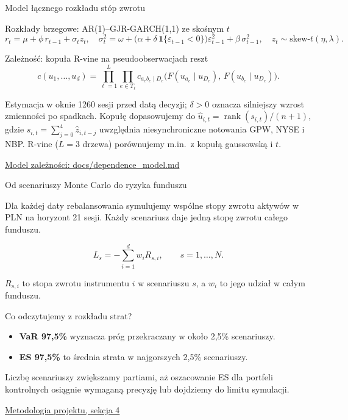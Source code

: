 \documentclass[aspectratio=169,11pt]{beamer}
\newcommand{\ind}{\mathbf{1}}
\newcommand{\source}[2]{\vfill{\scriptsize\href{#1}{#2}}}
\begin{document}
\begin{frame}{Model łącznego rozkładu stóp zwrotu}

\begin{block}{Rozkłady brzegowe: AR(1)--GJR-GARCH(1,1) ze skośnym \(t\)}
\[
  r_t=\mu+\phi\,r_{t-1}+\sigma_t z_t,\quad
  \sigma_t^2=\omega+\bigl(\alpha+\delta\,\ind\{\varepsilon_{t-1}<0\}\bigr)
    \varepsilon_{t-1}^2+\beta\,\sigma_{t-1}^2,\quad
  z_t\sim\text{skew-}t(\eta,\lambda).
\]
\end{block}

\begin{block}{Zależność: kopuła R-vine na pseudoobserwacjach reszt}
\[
  c(u_1,\ldots,u_d)=\prod_{\ell=1}^{L}\prod_{e\in T_\ell}
    c_{a_e b_e\mid D_e}\bigl(F(u_{a_e}\mid u_{D_e}),\,F(u_{b_e}\mid u_{D_e})\bigr).
\]
\end{block}

{\small
Estymacja w oknie 1260 sesji przed datą decyzji; \(\delta>0\) oznacza
silniejszy wzrost zmienności po spadkach. Kopułę dopasowujemy do
\(\hat u_{i,t}=\operatorname{rank}(s_{i,t})/(n+1)\), gdzie
\(s_{i,t}=\sum_{j=0}^{4}\hat z_{i,t-j}\) uwzględnia niesynchroniczne
notowania GPW, NYSE i NBP. R-vine (\(L=3\) drzewa) porównujemy m.in.\
z kopułą gaussowską i \(t\).
}

\source{https://github.com/michalmarchwiak/bsc-project/blob/main/docs/dependence_model.md}
       {Model zależności: docs/dependence\_model.md}
\end{frame}

\begin{frame}{Od scenariuszy Monte Carlo do ryzyka funduszu}

Dla każdej daty rebalansowania symulujemy wspólne stopy zwrotu
aktywów w PLN na horyzont 21 sesji. Każdy scenariusz daje jedną
stopę zwrotu całego funduszu.

\[
  L_s = -\sum_{i=1}^{d} w_i R_{s,i},
  \qquad s=1,\ldots,N.
\]

{\small
\(R_{s,i}\) to stopa zwrotu instrumentu \(i\) w scenariuszu \(s\),
a \(w_i\) to jego udział w całym funduszu.
}

\begin{block}{Co odczytujemy z rozkładu strat?}
\begin{itemize}
  \item \textbf{VaR 97,5\%} wyznacza próg przekraczany
        w około 2,5\% scenariuszy.
  \item \textbf{ES 97,5\%} to średnia strata
        w najgorszych 2,5\% scenariuszy.
\end{itemize}
\end{block}

Liczbę scenariuszy zwiększamy partiami, aż oszacowanie ES
dla portfeli kontrolnych osiągnie wymaganą precyzję
lub dojdziemy do limitu symulacji.

\source{https://github.com/michalmarchwiak/bsc-project/blob/main/docs/backtest.md}
       {Metodologia projektu, sekcja 4}
\end{frame}
\end{document}
